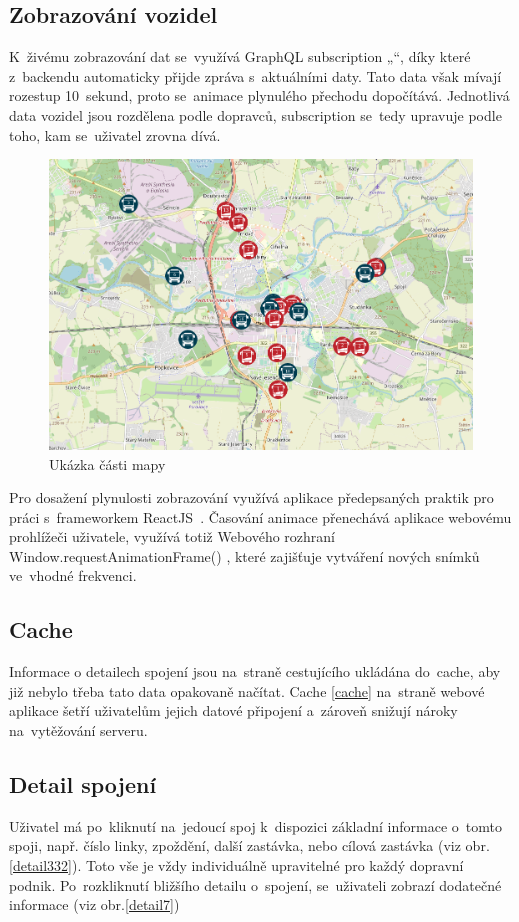 \subsection{Zobrazování vozidel}
K~živému zobrazování dat se~využívá GraphQL subscription „“, díky které z~backendu automaticky přijde zpráva s~aktuálními daty. Tato data však mívají rozestup 10~sekund, proto se~animace plynulého přechodu dopočítává. Jednotlivá data vozidel jsou rozdělena podle dopravců, subscription se~tedy upravuje podle toho, kam se~uživatel zrovna dívá.
\begin{figure}[H]
    \centering
    \includegraphics[width=1\textwidth]{images/Screenshot from 2023-03-18 20-15-00.png}
    \caption{Ukázka části mapy}
    \label{mapa}
\end{figure}

Pro dosažení plynulosti zobrazování využívá aplikace předepsaných praktik pro práci s~frameworkem ReactJS~\cite{reactlist}. Časování animace přenechává aplikace webovému prohlížeči uživatele, využívá totiž Webového rozhraní Window.requestAnimationFrame() \cite{animationframe}, které zajišťuje vytváření nových snímků ve~vhodné frekvenci.
\subsection{Cache}
Informace o detailech spojení jsou na~straně cestujícího ukládána do~cache, aby již nebylo třeba tato data opakovaně načítat. Cache \ref{cache} na~straně webové aplikace šetří uživatelům jejich datové připojení a~zároveň snižují nároky na~vytěžování serveru.

\subsection{Detail spojení}
Uživatel má po~kliknutí na~jedoucí spoj k~dispozici základní informace o~tomto spoji, např. číslo linky, zpoždění, další zastávka, nebo cílová zastávka (viz obr.\ref{detail332}). Toto vše je vždy individuálně upravitelné pro každý dopravní podnik. Po~rozkliknutí bližšího detailu o~spojení, se~uživateli zobrazí dodatečné informace (viz obr.\ref{detail7})

